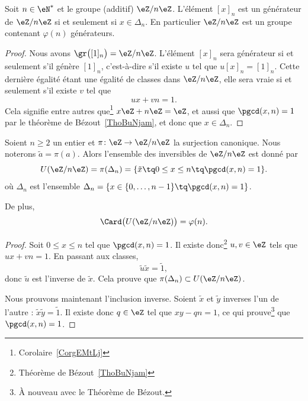 \begin{proposition}     \label{PropZnmuphiGensn}
    Soit \( n\in\eN^*\) et le groupe (additif) \( \eZ/n\eZ\). L'élément \( [x]_n\) est un générateur de \( \eZ/n\eZ\) si et seulement si \( x\in \Delta_n\). En particulier \( \eZ/n\eZ\) est un groupe contenant \( \varphi(n)\) générateurs.
\end{proposition}

\begin{proof}
    Nous avons \( \gr\big( [1]_n \big)=\eZ/n\eZ\). L'élément \( [x]_n\) sera générateur si et seulement s'il génère \( [1]_n \), c'est-à-dire s'il existe \( u\) tel que \( u[x]_n=[1]_n\). Cette dernière égalité étant une égalité de classes dans \( \eZ/n\eZ\), elle sera vraie si et seulement s'il existe \( v\) tel que
    \begin{equation}
        ux+vn=1.
    \end{equation}
    Cela signifie entre autres que\footnote{Corolaire~\ref{CorgEMtLj}} \( x\eZ+n\eZ=\eZ\), et aussi que \( \pgcd(x,n)=1\) par le théorème de Bézout~\ref{ThoBuNjam}, et donc que \( x\in \Delta_n\).
\end{proof}

\begin{proposition}     \label{PropZpintssiprempUzn}
    Soient \( n\geq 2\) un entier et \( \pi\colon \eZ\to \eZ/n\eZ\) la surjection canonique. Nous noterons \( \tilde a=\pi(a)\). Alors l'ensemble des inversibles de \( \eZ/n\eZ\) est donné par
    \begin{equation}
        U(\eZ/n\eZ)=\pi(\Delta_n)=\{ \tilde x\tq 0\leq x\leq n\tq\pgcd(x,n)=1 \}.
    \end{equation}
    où \( \Delta_n\) est l'ensemble $\Delta_n=\{ x\in\{ 0,\ldots,n-1 \}\tq\pgcd(x,n)=1 \}$.

    De plus,
    \begin{equation}
        \Card\big( U(\eZ/n\eZ) \big)=\varphi(n).
    \end{equation}
\end{proposition}

\begin{proof}
    Soit \( 0\leq x\leq n\) tel que \( \pgcd(x,n)=1\). Il existe donc\footnote{Théorème de Bézout~\ref{ThoBuNjam}} \( u,v\in\eZ\) tels que \( ux+vn=1\). En passant aux classes,
    \begin{equation}
        \tilde u\tilde x=\tilde 1,
    \end{equation}
    donc \( \tilde u\) est l'inverse de \( \tilde x\). Cela prouve que \( \pi(\Delta_n)\subset U(\eZ/n\eZ)\).

    Nous prouvons maintenant l'inclusion inverse. Soient \( \tilde x\) et \( \tilde y\) inverses l'un de l'autre : $\tilde x\tilde y=\tilde 1$. Il existe donc \( q\in\eZ\) tel que \( xy-qn=1\), ce qui prouve\footnote{À nouveau avec le Théorème de Bézout.} que \( \pgcd(x,n)=1\).
\end{proof}

